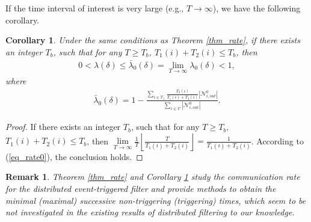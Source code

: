 \documentclass[journal,transmag]{IEEEtran}
\newtheorem{remark}{\textbf{Remark}}
\newtheorem{corollary}{\textbf{Corollary}}
\begin{document}
{If the  time interval of interest is very large (e.g., $T\rightarrow\infty$), we have the following corollary.
\begin{corollary}\label{coro_rate}
	Under the same conditions as Theorem \ref{thm_rate}, if there exists an integer $T_b$, such that for any $T\geq T_b$, $T_1(i)+T_2(i)\leq T_b$, then 
	\begin{align}
	0<\lambda (\delta)\leq \bar\lambda_0(\delta)=\lim\limits_{T\rightarrow\infty}\lambda_0(\delta)<1,
	\end{align}
	where 
	\begin{align}\label{eq_rate02}
	\bar \lambda_0(\delta)=1-\frac{\sum_{i\in\mathcal{V}_1}\frac{T_{2}(i)}{T_{1}(i)+T_{2}(i)}|\mathcal{N}_{i,out}^0|}{\sum_{i\in\mathcal{V}}|\mathcal{N}_{i,out}^0|}.
	\end{align}
\end{corollary}	
\begin{proof}
If there exists an integer $T_b$, such that for any $T\geq T_b$, $T_1(i)+T_2(i)\leq T_b$, then $\lim\limits_{T\rightarrow\infty}\frac{1}{T}\left\lfloor\frac{T}{T_{1}(i)+T_{2}(i)}\right\rfloor=\frac{1}{T_{1}(i)+T_{2}(i)}$. According to (\ref{eq_rate0}), the conclusion holds.
\end{proof}
\begin{remark}
	Theorem \ref{thm_rate} and Corollary \ref{coro_rate} study the communication rate for the distributed event-triggered filter and provide  methods to obtain the minimal (maximal) successive non-triggering (triggering) times, which seem to be not investigated in the existing results \cite{liu2015eventinformatics,liu2015event,Battistelli2016Distributed} of distributed filtering to our knowledge.
\end{remark}	
}
\end{document}
